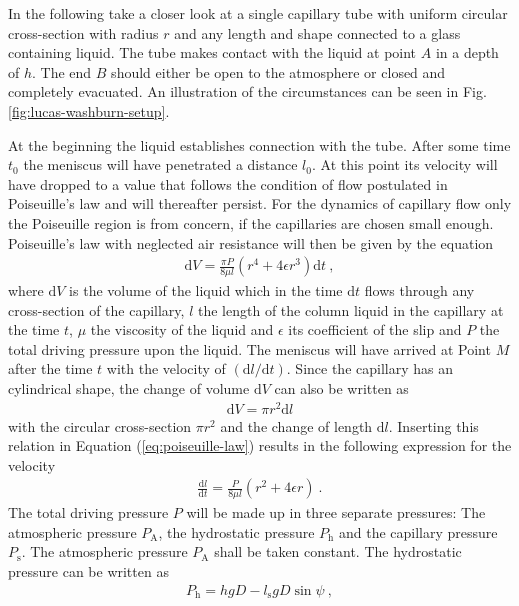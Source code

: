 \documentclass[aip, amsmath, amssymb, reprint, twocolumn, floatfix]{revtex4-1}
\newcommand{\dldt}{\frac{\mathrm{d}l}{\mathrm{d}t}}
\newcommand{\Pa}{P_\mathrm{A}}
\newcommand{\Pt}{P}
\newcommand{\Ps}{P_\mathrm{s}}
\newcommand{\Ph}{P_\mathrm{h}}
\newcommand{\ls}{l_\mathrm{s}}
\newcommand{\dV}{\mathrm{d}V}
\newcommand{\dt}{\mathrm{d}t}
\newcommand{\dl}{\mathrm{d}l}
\begin{document}
In the following take a closer look at a single capillary tube with uniform circular cross-section with radius $r$ and any length and shape connected to a glass containing liquid. The tube makes contact with the liquid at point $A$ in a depth of $h$. The end $B$ should either be open to the atmosphere or closed and completely evacuated. An illustration of the circumstances can be seen in Fig. \ref{fig:lucas-washburn-setup}.
\bigskip

At the beginning the liquid establishes connection with the tube. After some time $t_0$ the meniscus will have penetrated a distance $l_0$. At this point its velocity will have dropped to a value that follows the condition of flow postulated in Poiseuille's law and will thereafter persist. For the dynamics of capillary flow only the Poiseuille region is from concern, if the capillaries are chosen small enough. Poiseuille's law with neglected air resistance will then be given by the equation 
\begin{gather}
	\dV = \frac{\pi \Pt}{8\mu l}\left(r^4 + 4\epsilon r^3 \right) \dt~,
	\label{eq:poiseuille-law}
\end{gather}
where $\dV$ is the volume of the liquid which in the time $\dt$ flows through any cross-section of the capillary, $l$ the length of the column liquid in the capillary at the time $t$, $\mu$ the viscosity of the liquid and $\epsilon$ its coefficient of the slip and $\Pt$ the total driving pressure upon the liquid. The meniscus will have arrived at Point $M$ after the time $t$ with the velocity of $\left(\mathrm{d}l/\mathrm{d}t\right)$. Since the capillary has an cylindrical shape, the change of volume $\dV$ can also be written as
\begin{gather}
	\dV = \pi r^2 \dl
	\label{eq:change-cylinder}
\end{gather}
with the circular cross-section $\pi r^2$ and the change of length $\dl$. Inserting this relation in Equation (\ref{eq:poiseuille-law}) results in the following expression for the velocity
\begin{gather}
	\dldt = \frac{\Pt}{8\mu l}\left(r^2 + 4\epsilon r \right)~.
	\label{eq:poiseuille-velocity}
\end{gather}
The total driving pressure $\Pt$ will be made up in three separate pressures: The atmospheric pressure $\Pa$, the hydrostatic pressure $\Ph$ and the capillary pressure $\Ps$. The atmospheric pressure $\Pa$ shall be taken constant. The hydrostatic pressure can be written as
\begin{gather}
	\Ph = hgD - \ls g D \sin \psi~,
	\label{eq:hydrostatic-pressure}
\end{gather}
\end{document}
